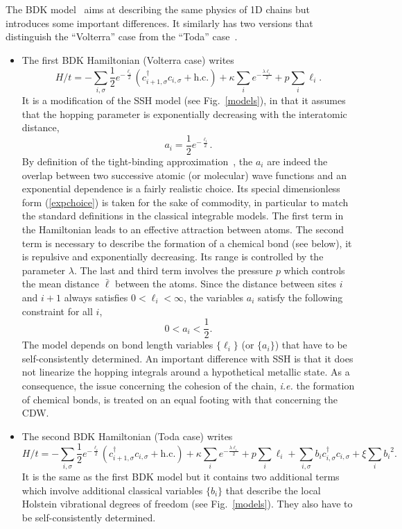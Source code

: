 \documentclass[]{revtex4-1}
\begin{document}
 The BDK model~\cite{BDK} aims at describing the same physics of 1D chains but introduces some important differences. It similarly has two versions that distinguish the ``Volterra'' case from the ``Toda'' case~\cite{BDKnames}.
 \begin{itemize}
  \item The first BDK Hamiltonian (Volterra case) writes   \begin{equation}
 H/t = -   \sum_{i,\sigma} \frac{1}{2} e^{-\frac{\ell_i}{2}} (c_{i+1,\sigma}^{\dagger} c_{i,\sigma} + \mbox{h.c.})   + \kappa \sum_{i} e^{-\frac{\lambda  \ell_i}{2}} + p \sum_{i} \ell_i. \label{Hamiltonian_volterra}
  \end{equation}
It is a modification of the SSH model (see Fig.~\ref{models}), in that it assumes that the hopping parameter is exponentially decreasing with the interatomic distance,
\begin{equation}
 a_i = \frac{1}{2} e^{-\frac{\ell_i}{2}}. \label{expchoice}
 \end{equation}
By definition of the tight-binding approximation~\cite{ashcroft}, the $ a_i$ are indeed the overlap between two successive atomic (or molecular) wave functions and an exponential dependence is a fairly realistic choice. Its special dimensionless form (\ref{expchoice}) is taken for the sake of commodity, in particular to match the standard definitions in the classical integrable models. The first term in the Hamiltonian leads to an effective attraction between atoms. The second term is necessary to describe the formation of a chemical bond (see below), it is repulsive and exponentially decreasing. Its range is controlled by the parameter $\lambda$. The last and third term involves the pressure $p$ which controls the mean distance $\bar{\ell}$ between the atoms. Since the distance between sites $i$ and $i+1$ always satisfies $0<\ell_i< \infty $, the variables $a_i$ satisfy the following constraint for all $i$,
\begin{equation}
\label{constraint}
0 < a_i < \frac{1}{2}.
\end{equation}
The model depends on bond length variables $\{\ell_i\}$ (or $\{a_i\}$) that have to be self-consistently determined. An important difference with SSH is that it does not linearize the hopping integrals around a hypothetical metallic state.  As a consequence, the issue concerning the cohesion of the chain, \textit{i.e.} the formation of chemical bonds, is treated on an equal footing with that concerning the CDW. 
\item The second BDK Hamiltonian (Toda case) writes
  \begin{equation}
 H/t =    -  \sum_{i, \sigma}  \frac{1}{2}  e^{-\frac{\ell_i}{2}} (c_{i+1,\sigma}^{\dagger} c_{i, \sigma} + \mbox{h.c.})   +  \kappa \sum_{i}   e^{-\frac{\lambda  \ell_i}{2}}  + p \sum_{i} \ell_i + \sum_{i, \sigma} b_i c_{i,\sigma}^{\dagger} c_{i,\sigma} +  \xi \sum_{i} {b_i}^2. \label{Hamiltonian_toda}
 \end{equation}
  It is the same as the first BDK model but it contains two additional terms which involve additional classical variables $\{b_i\}$ that describe the local Holstein vibrational degrees of freedom (see Fig.~\ref{models}). They also have to be  self-consistently determined.
  

\end{itemize}
\end{document}
